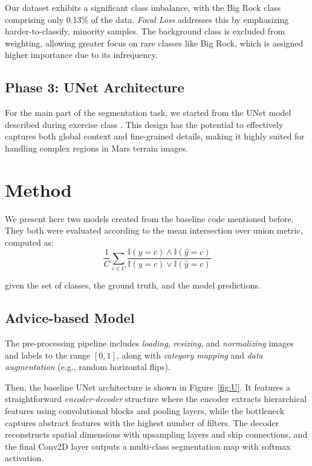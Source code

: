 \documentclass[11pt]{article}
\begin{document}
\begin{multicols*}{2}
    \noindent Our dataset exhibits a significant class imbalance, with the Big Rock class comprising only 0.13\% of the data. \textit{Focal Loss} addresses this by emphasizing harder-to-classify, minority samples. The background class is excluded from weighting, allowing greater focus on rare classes like Big Rock, which is assigned higher importance due to its infrequency.

    \subsection{Phase 3: UNet Architecture}

    For the main part of the segmentation task, we started from the UNet model described during exercise class \cite{unet}. This design has the potential to effectively captures both global context and fine-grained details, making it highly suited for handling complex regions in Mars terrain images.


    \section{Method} %
    \label{sec:method}

    We present here two models created from the baseline code mentioned before. They both were evaluated according to the mean intersection over union metric, computed as:
    \begin{equation*}
    \frac{1}{C}\sum_{c\in C}\frac{\mathbb{I}(y=c)\wedge \mathbb{I}(\hat y=c)}{\mathbb{I}(y=c)\vee \mathbb{I}(\hat y=c)}
    \end{equation*}

    \noindent given the set of classes, the ground truth, and the model predictions.

    \subsection{Advice-based Model}

    The pre-processing pipeline includes \emph{loading}, \emph{resizing}, and \emph{normalizing} images and labels to the range $[0,1]$, along with \emph{category mapping} and \emph{data augmentation} (e.g., random horizontal flips).
    
    Then, the baseline UNet architecture is shown in Figure~\ref{fig:U}. It features a straightforward \emph{encoder-decoder} structure where the encoder extracts hierarchical features using convolutional blocks and pooling layers, while the bottleneck captures abstract features with the highest number of filters. The decoder reconstructs spatial dimensions with upsampling layers and skip connections, and the final Conv2D layer outputs a multi-class segmentation map with softmax activation.


\end{multicols*}
\end{document}
